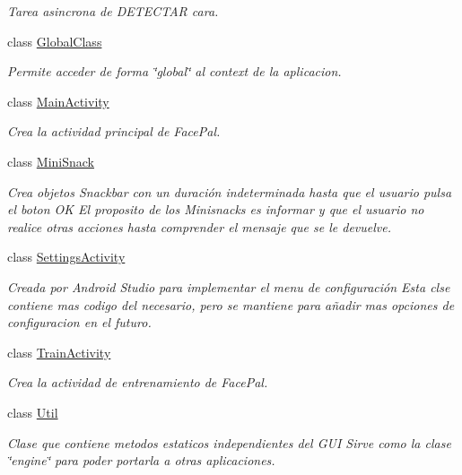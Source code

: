 \begin{DoxyCompactItemize}
\begin{DoxyCompactList}\small\item\em Tarea asincrona de D\+E\+T\+E\+C\+T\+AR cara. \end{DoxyCompactList}\item 
class \mbox{\hyperlink{classcom_1_1loalon_1_1pfg_1_1facepal_1_1_global_class}{Global\+Class}}
\begin{DoxyCompactList}\small\item\em Permite acceder de forma \char`\"{}global\char`\"{} al context de la aplicacion. \end{DoxyCompactList}\item 
class \mbox{\hyperlink{classcom_1_1loalon_1_1pfg_1_1facepal_1_1_main_activity}{Main\+Activity}}
\begin{DoxyCompactList}\small\item\em Crea la actividad principal de Face\+Pal. \end{DoxyCompactList}\item 
class \mbox{\hyperlink{classcom_1_1loalon_1_1pfg_1_1facepal_1_1_mini_snack}{Mini\+Snack}}
\begin{DoxyCompactList}\small\item\em Crea objetos Snackbar con un duración indeterminada hasta que el usuario pulsa el boton OK El proposito de los Minisnacks es informar y que el usuario no realice otras acciones hasta comprender el mensaje que se le devuelve. \end{DoxyCompactList}\item 
class \mbox{\hyperlink{classcom_1_1loalon_1_1pfg_1_1facepal_1_1_settings_activity}{Settings\+Activity}}
\begin{DoxyCompactList}\small\item\em Creada por Android Studio para implementar el menu de configuración Esta clse contiene mas codigo del necesario, pero se mantiene para añadir mas opciones de configuracion en el futuro. \end{DoxyCompactList}\item 
class \mbox{\hyperlink{classcom_1_1loalon_1_1pfg_1_1facepal_1_1_train_activity}{Train\+Activity}}
\begin{DoxyCompactList}\small\item\em Crea la actividad de entrenamiento de Face\+Pal. \end{DoxyCompactList}\item 
class \mbox{\hyperlink{classcom_1_1loalon_1_1pfg_1_1facepal_1_1_util}{Util}}
\begin{DoxyCompactList}\small\item\em Clase que contiene metodos estaticos independientes del G\+UI Sirve como la clase \char`\"{}engine\char`\"{} para poder portarla a otras aplicaciones. \end{DoxyCompactList}\end{DoxyCompactItemize}
